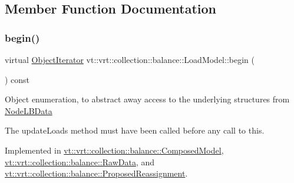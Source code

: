 \subsection{Member Function Documentation}
\mbox{\label{structvt_1_1vrt_1_1collection_1_1balance_1_1_load_model_a085a13e3cfeff2beb88b49ddaed4ef8d}} 
\subsubsection{\texorpdfstring{begin()}{begin()}}
{\footnotesize\ttfamily virtual \hyperlink{structvt_1_1vrt_1_1collection_1_1balance_1_1_object_iterator}{Object\+Iterator} vt\+::vrt\+::collection\+::balance\+::\+Load\+Model\+::begin (\begin{DoxyParamCaption}{ }\end{DoxyParamCaption}) const\hspace{0.3cm}{\ttfamily [pure virtual]}}

Object enumeration, to abstract away access to the underlying structures from \hyperlink{structvt_1_1vrt_1_1collection_1_1balance_1_1_node_l_b_data}{Node\+L\+B\+Data}

The {\ttfamily update\+Loads} method must have been called before any call to this. 

Implemented in \hyperlink{classvt_1_1vrt_1_1collection_1_1balance_1_1_composed_model_a7d32b6f8a0ca5970674238325df11783}{vt\+::vrt\+::collection\+::balance\+::\+Composed\+Model}, \hyperlink{structvt_1_1vrt_1_1collection_1_1balance_1_1_raw_data_acfe356d51313995dacf50868f3fac19b}{vt\+::vrt\+::collection\+::balance\+::\+Raw\+Data}, and \hyperlink{structvt_1_1vrt_1_1collection_1_1balance_1_1_proposed_reassignment_ad7a65c6be802368df458f6005ef69d23}{vt\+::vrt\+::collection\+::balance\+::\+Proposed\+Reassignment}.

\mbox{\label{structvt_1_1vrt_1_1collection_1_1balance_1_1_load_model_a2b3212a8438a4b58a73c41db841f15b7}} 
